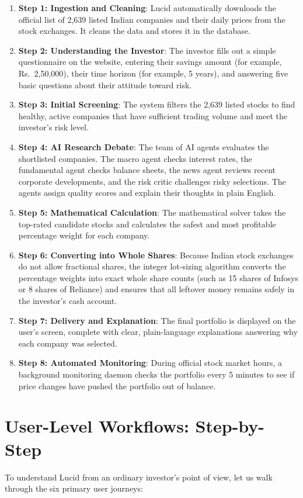 \begin{enumerate}
    \item \textbf{Step 1: Ingestion and Cleaning}: Lucid automatically downloads the official list of 2,639 listed Indian companies and their daily prices from the stock exchanges. It cleans the data and stores it in the database.
    \item \textbf{Step 2: Understanding the Investor}: The investor fills out a simple questionnaire on the website, entering their savings amount (for example, Rs.~2,50,000), their time horizon (for example, 5 years), and answering five basic questions about their attitude toward risk.
    \item \textbf{Step 3: Initial Screening}: The system filters the 2,639 listed stocks to find healthy, active companies that have sufficient trading volume and meet the investor's risk level.
    \item \textbf{Step 4: AI Research Debate}: The team of AI agents evaluates the shortlisted companies. The macro agent checks interest rates, the fundamental agent checks balance sheets, the news agent reviews recent corporate developments, and the risk critic challenges risky selections. The agents assign quality scores and explain their thoughts in plain English.
    \item \textbf{Step 5: Mathematical Calculation}: The mathematical solver takes the top-rated candidate stocks and calculates the safest and most profitable percentage weight for each company.
    \item \textbf{Step 6: Converting into Whole Shares}: Because Indian stock exchanges do not allow fractional shares, the integer lot-sizing algorithm converts the percentage weights into exact whole share counts (such as 15 shares of Infosys or 8 shares of Reliance) and ensures that all leftover money remains safely in the investor's cash account.
    \item \textbf{Step 7: Delivery and Explanation}: The final portfolio is displayed on the user's screen, complete with clear, plain-language explanations answering why each company was selected.
    \item \textbf{Step 8: Automated Monitoring}: During official stock market hours, a background monitoring daemon checks the portfolio every 5 minutes to see if price changes have pushed the portfolio out of balance.
\end{enumerate}

\section{User-Level Workflows: Step-by-Step}
To understand Lucid from an ordinary investor's point of view, let us walk through the six primary user journeys:

